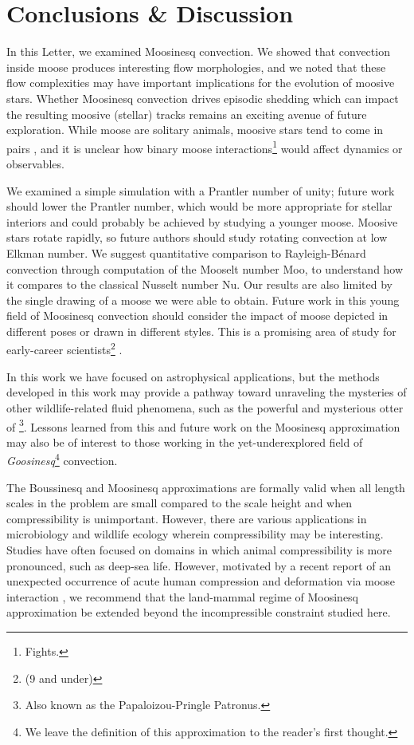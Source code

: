 \section{Conclusions \& Discussion}
\label{sec:conclusions}

In this Letter, we examined Moosinesq convection.
We showed that convection inside moose produces interesting flow morphologies, and we noted that these flow complexities may have important implications for the evolution of moosive stars.
Whether Moosinesq convection drives episodic shedding which can impact the resulting moosive (stellar) tracks remains an exciting avenue of future exploration.
While moose are solitary animals, moosive stars tend to come in pairs \citep{goodwin_kroupa_2005}, and it is unclear how binary moose interactions\footnote{Fights.}  would affect dynamics or observables.

We examined a simple simulation with a Prantler number of unity; future work should lower the Prantler number, which would be more appropriate for stellar interiors \citep{garaud_2021} and could probably be achieved by studying a younger moose.
Moosive stars rotate rapidly, so future authors should study rotating convection at low Elkman number.
We suggest quantitative comparison to Rayleigh-B\'{e}nard convection through computation of the Mooselt number Moo, to understand how it compares to the classical Nusselt number Nu.
Our results are also limited by the single drawing of a moose we were able to obtain.
Future work in this young field of Moosinesq convection should consider the impact of moose depicted in different poses or drawn in different styles.
This is a promising area of study for early-career scientists\footnote{(9 and under)} \cite[see e.g.,][Fig.~9]{luger_etal_2019}.

In this work we have focused on astrophysical applications, but the methods developed in this work may provide a pathway toward unraveling the mysteries of other wildlife-related fluid phenomena, such as the powerful and mysterious otter of \cite{Schwab2021}\footnote{Also known as the Papaloizou-Pringle Patronus.}.
Lessons learned from this and future work on the Moosinesq approximation may also be of interest to those working in the yet-underexplored field of \textit{Goosinesq}\footnote{We leave the definition of this approximation to the reader's first thought.} convection.

The Boussinesq and Moosinesq approximations are formally valid when all length scales in the problem are small compared to the scale height and when compressibility is unimportant.
However, there are various applications in microbiology \citep[e.g.][]{Ravetto2014} and wildlife ecology \citep[e.g.][]{Enright1963} wherein compressibility may be interesting.
Studies have often focused on domains in which animal compressibility is more pronounced, such as deep-sea life.
However, motivated by a recent report of an unexpected occurrence of acute human compression and deformation via moose interaction \citep{Gudmannsson2018}, we recommend that the land-mammal regime of Moosinesq approximation be extended beyond the incompressible constraint studied here.


